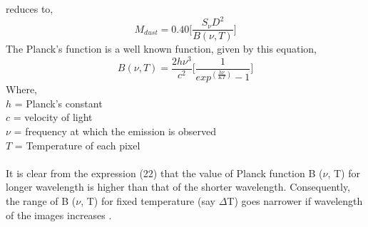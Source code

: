 \documentclass[fleqn,a4paper,12pt,oneside]{article}
\begin{document}
reduces to,
\begin{equation}\label{9}
M_{dust} = 0.40\bigg[\frac{S_{\nu}D^{2}}{{B(\nu, T)}}\bigg]
\end{equation}
The Planck's function is a well known function, given by this
equation,
\begin{equation}\label{10}
B(\nu, T) = \frac{2h\nu^{3}}{{c^{2}}}\bigg[\frac{1}{exp^(\frac{h\nu}{KT})-1}\bigg]
\end{equation}
Where,
\\
$h$ = Planck's constant\\
$c$ = velocity of light\\
${\nu}$ = frequency at which the emission is observed\\
$T$ = Temperature of each pixel
\\
\\
It is clear from the expression (22) that the value of Planck
function B ($\nu$, T) for longer wavelength is higher than that of
the shorter wavelength. Consequently, the range of B ($\nu$, T)
for fixed temperature (say $\Delta$T) goes narrower if wavelength
of the images increases \cite{39}.
\end{document}

